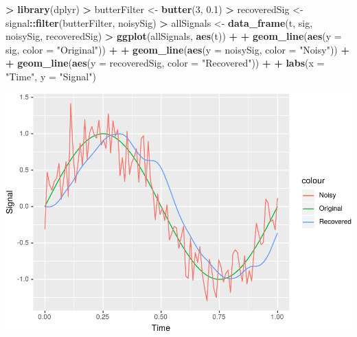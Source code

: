 \documentclass[]{krantz}
\makeatletter
\newenvironment{Shaded}{\begin{snugshade}}{\end{snugshade}}
\newcommand{\DataTypeTok}[1]{\textcolor[rgb]{0.27,0.27,0.27}{#1}}
\newcommand{\DecValTok}[1]{\textcolor[rgb]{0.06,0.06,0.06}{#1}}
\newcommand{\FloatTok}[1]{\textcolor[rgb]{0.06,0.06,0.06}{#1}}
\newcommand{\KeywordTok}[1]{\textcolor[rgb]{0.27,0.27,0.27}{\textbf{#1}}}
\newcommand{\NormalTok}[1]{#1}
\newcommand{\OperatorTok}[1]{\textcolor[rgb]{0.43,0.43,0.43}{\textbf{#1}}}
\newcommand{\StringTok}[1]{\textcolor[rgb]{0.5,0.5,0.5}{#1}}
\newenvironment{kframe}{%
\medskip{}
\setlength{\fboxsep}{.8em}
 \def\at@end@of@kframe{}%
 \ifinner\ifhmode%
  \def\at@end@of@kframe{\end{minipage}}%
  \begin{minipage}{\columnwidth}%
 \fi\fi%
 \def\FrameCommand##1{\hskip\@totalleftmargin \hskip-\fboxsep
 \colorbox{shadecolor}{##1}\hskip-\fboxsep
     \hskip-\linewidth \hskip-\@totalleftmargin \hskip\columnwidth}%
 \MakeFramed {\advance\hsize-\width
   \@totalleftmargin\z@ \linewidth\hsize
   \@setminipage}}%
 {\par\unskip\endMakeFramed%
 \at@end@of@kframe}
\renewenvironment{Shaded}{\begin{kframe}}{\end{kframe}}
\makeatother
\begin{document}
\begin{Shaded}
\begin{Highlighting}[]
\OperatorTok{>}\StringTok{ }\KeywordTok{library}\NormalTok{(dplyr)}
\OperatorTok{>}\StringTok{ }\NormalTok{butterFilter <-}\StringTok{ }\KeywordTok{butter}\NormalTok{(}\DecValTok{3}\NormalTok{, }\FloatTok{0.1}\NormalTok{)}
\OperatorTok{>}\StringTok{ }\NormalTok{recoveredSig <-}\StringTok{ }\NormalTok{signal}\OperatorTok{::}\KeywordTok{filter}\NormalTok{(butterFilter, noisySig)}
\OperatorTok{>}\StringTok{ }\NormalTok{allSignals <-}\StringTok{ }\KeywordTok{data_frame}\NormalTok{(t, sig, noisySig, recoveredSig)}
\OperatorTok{>}\StringTok{ }\KeywordTok{ggplot}\NormalTok{(allSignals, }\KeywordTok{aes}\NormalTok{(t)) }\OperatorTok{+}\StringTok{ }
\OperatorTok{+}\StringTok{   }\KeywordTok{geom_line}\NormalTok{(}\KeywordTok{aes}\NormalTok{(}\DataTypeTok{y =}\NormalTok{ sig, }\DataTypeTok{color =} \StringTok{"Original"}\NormalTok{)) }\OperatorTok{+}\StringTok{ }
\OperatorTok{+}\StringTok{   }\KeywordTok{geom_line}\NormalTok{(}\KeywordTok{aes}\NormalTok{(}\DataTypeTok{y =}\NormalTok{ noisySig, }\DataTypeTok{color =} \StringTok{"Noisy"}\NormalTok{)) }\OperatorTok{+}\StringTok{ }
\OperatorTok{+}\StringTok{   }\KeywordTok{geom_line}\NormalTok{(}\KeywordTok{aes}\NormalTok{(}\DataTypeTok{y =}\NormalTok{ recoveredSig, }\DataTypeTok{color =} \StringTok{"Recovered"}\NormalTok{)) }\OperatorTok{+}\StringTok{ }
\OperatorTok{+}\StringTok{   }\KeywordTok{labs}\NormalTok{(}\DataTypeTok{x =} \StringTok{"Time"}\NormalTok{, }\DataTypeTok{y =} \StringTok{"Signal"}\NormalTok{)}
\end{Highlighting}
\end{Shaded}

\includegraphics{bookdown_files/figure-latex/unnamed-chunk-311-1.pdf}
\end{document}

